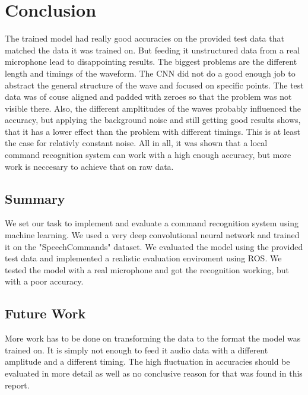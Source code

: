 \chapter{Conclusion}
The trained model had really good accuracies on the provided test data that matched the data it was trained on. But feeding it unstructured data
from a real microphone lead to disappointing results. The biggest problems are the different length and timings of the waveform. The CNN did not do a good enough
job to abstract the general structure of the wave and focused on specific points. The test data was of couse aligned and padded with zeroes so that the problem was not
visible there. Also, the different ampltitudes of the waves probably influenced the accuracy, but applying the background noise and still getting good results shows, that
it has a lower effect than the problem with different timings. This is at least the case for relativly constant noise. All in all, it was shown that a local command
recognition system can work with a high enough accuracy, but more work is neccesary to achieve that on raw data.

\section{Summary}
We set our task to implement and evaluate a command recognition system using machine learning. We used a very deep convolutional neural network and trained it
on the "SpeechCommands" dataset. We evaluated the model using the provided test data and implemented a realistic evaluation enviroment using ROS. We tested the model
with a real microphone and got the recognition working, but with a poor accuracy.

\section{Future Work}
More work has to be done on transforming the data to the format the model was trained on. It is simply not enough to feed it audio data with
a different amplitude and a different timing. The high fluctuation in accuracies should be evaluated in more detail as well as no conclusive reason for that
was found in this report.